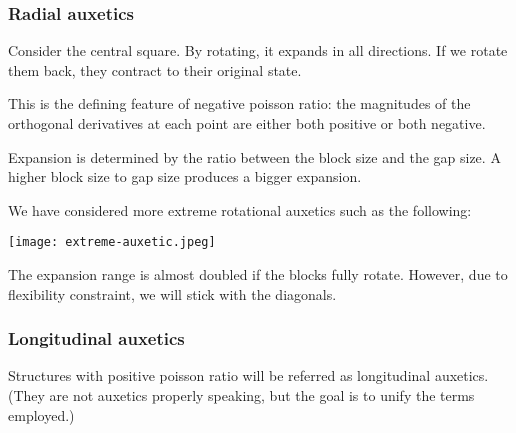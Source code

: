 \documentclass{article}
\begin{document}
\subsubsection{Radial auxetics}


\vspace{5mm}

Consider the central square. By rotating, it expands in all directions. If we rotate them back, they contract to their original state.

This is the defining feature of negative poisson ratio: the magnitudes of the orthogonal derivatives at each point are either both positive or both negative.

Expansion is determined by the ratio between the block size and the gap size. A higher block size to gap size produces a bigger expansion.

We have considered more extreme rotational auxetics such as the following:

\texttt{[image: extreme-auxetic.jpeg]}

\vspace{5mm}

The expansion range is almost doubled if the blocks fully rotate. However, due to flexibility constraint, we will stick with the diagonals.

\subsubsection{Longitudinal auxetics}
Structures with positive poisson ratio will be referred as longitudinal auxetics. (They are not auxetics properly speaking, but the goal is to unify the terms employed.)
\end{document}
